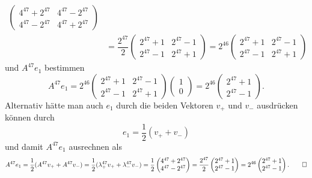 \begin{loesung}
\begin{align*}
\begin{pmatrix}
 4^{47}+2^{47} & 4^{47}-2^{47}\\
 4^{47}-2^{47} & 4^{47}+2^{47}
\end{pmatrix}\\
&= 
\dfrac{2^{47}}{2}
\begin{pmatrix}
 2^{47}+1 & 2^{47}-1\\
 2^{47}-1 & 2^{47}+1
\end{pmatrix}
= 
2^{46}
\begin{pmatrix}
 2^{47}+1 & 2^{47}-1\\
 2^{47}-1 & 2^{47}+1
\end{pmatrix}
\end{align*}
und $A^{47}e_1$ bestimmen
\[
A^{47}e_1=
2^{46}
\begin{pmatrix}
 2^{47}+1 & 2^{47}-1\\
 2^{47}-1 & 2^{47}+1
\end{pmatrix}
\begin{pmatrix}
1\\0
\end{pmatrix}
=2^{46}\begin{pmatrix}
2^{47}+1\\
2^{47}-1
\end{pmatrix}.
\]
Alternativ hätte man auch $e_1$ durch 
die beiden Vektoren $v_+$ und $v_-$ ausdrücken können durch
\[
e_1=\frac12(v_++v_-)
\]
und damit $A^{47}e_1$ ausrechnen als
\[
A^{47}e_1=\frac12(A^{47}v_++A^{47}v_-)=\frac12( \lambda_+^{47}v_++\lambda_-^{47}v_-)
=\frac12\begin{pmatrix}
4^{47}+2^{47}\\
4^{47}-2^{47}
\end{pmatrix}
=\frac{2^{47}}2\begin{pmatrix}
2^{47}+1\\
2^{47}-1
\end{pmatrix}
=2^{46}\begin{pmatrix}
2^{47}+1\\
2^{47}-1
\end{pmatrix}.
\qedhere
\]
\end{loesung}

